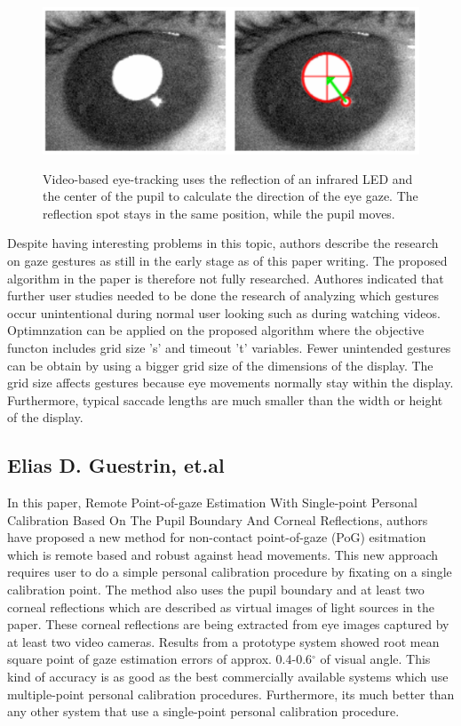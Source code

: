 \begin{figure}[!hbt]
  \centering
  \includegraphics[width=4.5in,height=2in]{heiko.png}
  \caption{Video-based eye-tracking uses the reflection of an infrared LED and the center of the pupil to calculate the direction of the eye gaze. The reflection spot stays in the same position, while the pupil moves.}
  \label{heiko}
\end{figure}

Despite having interesting problems in this topic, authors describe the research on gaze gestures as still in the early stage as of this paper writing. The proposed algorithm in the paper is therefore not fully researched. Authores indicated that further user studies needed to be done the research of analyzing which gestures occur unintentional during normal user looking such as during watching videos. Optimnzation can be applied on the proposed algorithm where the objective functon includes grid size 's' and timeout 't' variables. Fewer unintended gestures can be obtain by using a bigger grid size of the dimensions of the display. The grid size affects gestures because eye movements normally stay within the display. Furthermore, typical saccade lengths are much smaller than the width or height of the display.


\subsection{Elias D. Guestrin, et.al \cite{23}}

In this paper, Remote Point-of-gaze Estimation With Single-point Personal Calibration Based On The Pupil Boundary And Corneal Reflections, authors have proposed a new method for non-contact point-of-gaze (PoG) esitmation which is remote based and robust against head movements. This new approach requires user to do a simple personal calibration procedure by fixating on a single calibration point. The method also uses the pupil boundary and at least two corneal reflections which are described as virtual images of light sources in the paper. These corneal reflections are being extracted from eye images captured by at least two video cameras. Results from a prototype system showed root mean square point of gaze estimation errors of approx. 0.4-0.6$^{\circ}$ of visual angle. This kind of accuracy is as good as the best commercially available systems which use multiple-point personal calibration procedures. Furthermore, its much better than any other system that use a single-point personal calibration procedure.

